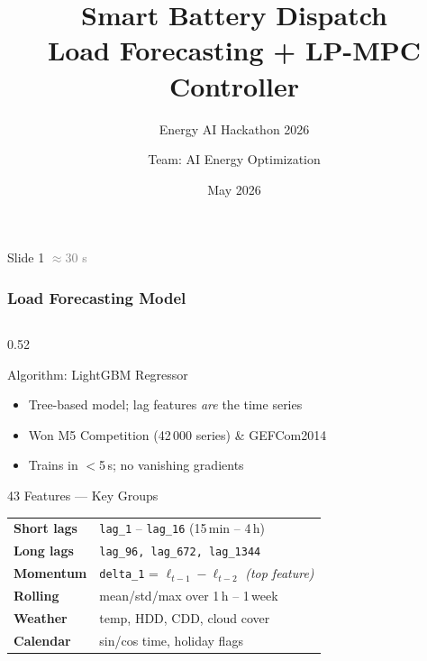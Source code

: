\documentclass[aspectratio=169, 10pt]{beamer}
\title[Energy AI Hackathon 2026]%
      {\textbf{Smart Battery Dispatch}\\[2pt]
       \large Load Forecasting + LP-MPC Controller}
\subtitle{Energy AI Hackathon 2026}
\author{Team: AI Energy Optimization}
\institute{Sondrio Residential Prosumer --- Italy}
\date{May 2026}
\begin{document}

\begin{frame}[plain]
  \titlepage
\end{frame}

\begin{frame}{Slide 1 \hfill \textcolor{gray}{\small$\approx$30 s}}
  \frametitle{Load Forecasting Model}

  \begin{columns}[T]
    \begin{column}{0.52\textwidth}
      \begin{block}{Algorithm: LightGBM Regressor}
        \begin{itemize}
          \item Tree-based model; lag features \textit{are} the time series
          \item Won M5 Competition (42\,000 series) \& GEFCom2014
          \item Trains in $<$5\,s; no vanishing gradients
        \end{itemize}
      \end{block}

      \vspace{4pt}
      \begin{block}{43 Features — Key Groups}
        \renewcommand{\arraystretch}{1.1}
        \small
        \begin{tabular}{ll}
          \textbf{Short lags}   & \texttt{lag\_1} -- \texttt{lag\_16}
                                  (15\,min -- 4\,h) \\
          \textbf{Long lags}    & \texttt{lag\_96, lag\_672, lag\_1344} \\
          \textbf{Momentum}     & \texttt{delta\_1} = $\ell_{t-1}-\ell_{t-2}$
                                  \textit{(top feature)} \\
          \textbf{Rolling}      & mean/std/max over 1\,h -- 1\,week \\
          \textbf{Weather}      & temp, HDD, CDD, cloud cover \\
          \textbf{Calendar}     & sin/cos time, holiday flags \\
        \end{tabular}
      \end{block}


\end{column}
\end{columns}
\end{frame}
\end{document}
